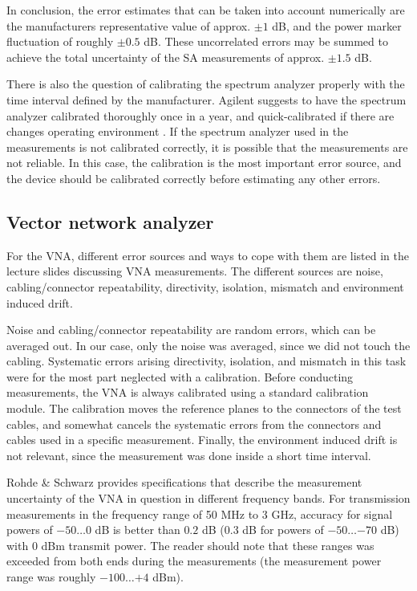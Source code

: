 \documentclass[a4paper, 12pt]{article}
\begin{document}
In conclusion, the error estimates that can be taken into account numerically are 
the manufacturers representative value of approx. $\pm 1$ dB, and the power marker 
fluctuation of roughly $\pm 0.5$ dB. These uncorrelated errors may be summed to 
achieve the total uncertainty of the SA measurements of approx. $\pm 1.5$ dB. 

There is also the question of calibrating the spectrum analyzer properly with 
the time interval defined by the manufacturer. Agilent suggests to have the spectrum 
analyzer calibrated thoroughly once in a year, and quick-calibrated if there are 
changes operating environment \cite{sa2}. If the spectrum analyzer used in the 
measurements is not calibrated correctly, it is possible that the measurements are 
not reliable. In this case, the calibration is the most important error source, and 
the device should be calibrated correctly before estimating any other errors.


\subsection{Vector network analyzer}

For the VNA, different error sources and ways to cope with them are listed in the 
lecture slides discussing VNA measurements. The different sources are noise, 
cabling/connector repeatability, directivity, isolation, mismatch and environment 
induced drift. 

Noise and cabling/connector repeatability are random errors, which can be averaged 
out. In our case, only the noise was averaged, since we did not touch the cabling. 
Systematic errors arising directivity, isolation, and mismatch in this task were
for the most part neglected with a calibration. Before conducting measurements, 
the VNA is always calibrated using a standard calibration module. The calibration 
moves the reference planes to the connectors of the test cables, and somewhat 
cancels the systematic errors from the connectors and cables used in a specific 
measurement. Finally, the environment induced drift is not relevant, since the 
measurement was done inside a short time interval.

Rohde \& Schwarz provides specifications that describe the measurement uncertainty 
of the VNA in question in different frequency bands. For transmission measurements 
in the frequency range of 50 MHz to 3 GHz, accuracy for signal powers of $-50 \ldots 0$ 
dB is better than $0.2$ dB ($0.3$ dB for powers of $-50 \ldots {-70}$ dB) with 0 dBm 
transmit power. \cite{vna} The reader should note that these ranges was exceeded 
from both ends during the measurements (the measurement power range was roughly 
$-100 \ldots {+4}$ dBm). 
\end{document}
